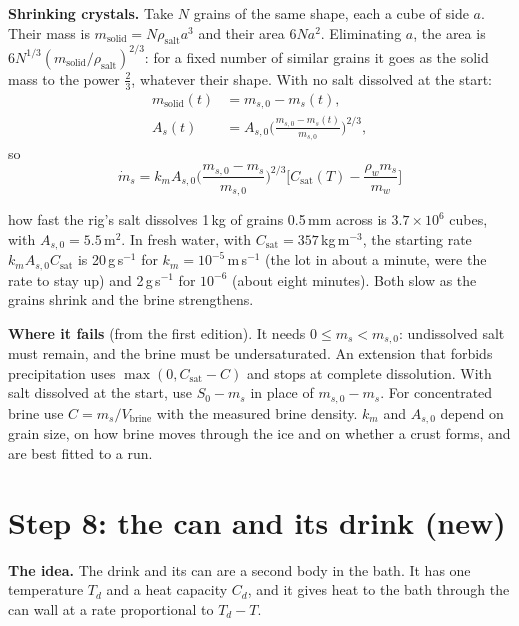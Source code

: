 \documentclass[11pt,a4paper]{article}
\newcommand{\Csat}{C_{\mathrm{sat}}}
\newcommand{\para}[1]{\par\smallskip\noindent\textbf{#1}\enspace}
\begin{document}
\para{Shrinking crystals.} Take $N$ grains of the same shape, each a cube of side $a$. Their mass is
$m_{\mathrm{solid}} = N\rho_{\mathrm{salt}}a^3$ and their area $6Na^2$. Eliminating $a$, the area is
$6N^{1/3}(m_{\mathrm{solid}}/\rho_{\mathrm{salt}})^{2/3}$: for a fixed number of similar grains it goes as the
solid mass to the power $\tfrac23$, whatever their shape. With no salt dissolved at the start:
\begin{align}
m_{\mathrm{solid}}(t) &= m_{s,0} - m_s(t), \label{eq:s7-solid}\\
A_s(t) &= A_{s,0}\Big(\frac{m_{s,0} - m_s(t)}{m_{s,0}}\Big)^{2/3}, \label{eq:s7-As}
\end{align}
so
\begin{equation}
\boxed{\,\dot m_s = k_mA_{s,0}\Big(\frac{m_{s,0} - m_s}{m_{s,0}}\Big)^{2/3}\Big[\Csat(T) - \frac{\rho_w m_s}{m_w}\Big]\,} \label{eq:s7-boxed}
\end{equation}

\begin{worked}{how fast the rig's salt dissolves}
1\,kg of grains 0.5\,mm across is $3.7\times10^6$ cubes, with $A_{s,0} = 5.5$\,m$^2$. In fresh water,
with $\Csat = 357$\,kg\,m$^{-3}$, the starting rate $k_mA_{s,0}\Csat$ is 20\,g\,s$^{-1}$ for
$k_m = 10^{-5}$\,m\,s$^{-1}$ (the lot in about a minute, were the rate to stay up) and 2\,g\,s$^{-1}$ for
$10^{-6}$ (about eight minutes). Both slow as the grains shrink and the brine strengthens.
\end{worked}

\para{Where it fails} (from the first edition). It needs $0 \le m_s < m_{s,0}$: undissolved salt must
remain, and the brine must be undersaturated. An extension that forbids precipitation uses
$\max(0, \Csat - C)$ and stops at complete dissolution. With salt dissolved at the start, use $S_0 - m_s$ in
place of $m_{s,0} - m_s$. For concentrated brine use $C = m_s/V_{\mathrm{brine}}$ with the measured brine
density. $k_m$ and $A_{s,0}$ depend on grain size, on how brine moves through the ice and on whether a crust
forms, and are best fitted to a run.

\section{Step 8: the can and its drink (new)}\label{sec:s8}

\para{The idea.} The drink and its can are a second body in the bath. It has one temperature $T_d$ and a
heat capacity $C_d$, and it gives heat to the bath through the can wall at a rate proportional to $T_d - T$.
\end{document}
